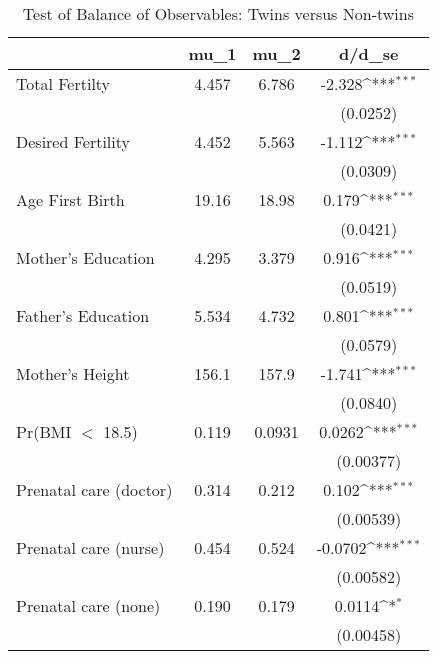 \begin{table}[htbp]\centering
\def\sym#1{\ifmmode^{#1}\else\(^{#1}\)\fi}
\caption{Test of Balance of Observables: Twins versus Non-twins \label{TWINtab:comp}}
\begin{tabular}{l*{1}{ccc}}
\toprule
                    &        mu\_1&        mu\_2&      d/d\_se         \\
\midrule
Total Fertilty      &       4.457&       6.786&      -2.328\sym{***}\\
                    &            &            &    (0.0252)         \\
Desired Fertility   &       4.452&       5.563&      -1.112\sym{***}\\
                    &            &            &    (0.0309)         \\
Age First Birth     &       19.16&       18.98&       0.179\sym{***}\\
                    &            &            &    (0.0421)         \\
Mother's Education  &       4.295&       3.379&       0.916\sym{***}\\
                    &            &            &    (0.0519)         \\
Father's Education  &       5.534&       4.732&       0.801\sym{***}\\
                    &            &            &    (0.0579)         \\
Mother's Height     &       156.1&       157.9&      -1.741\sym{***}\\
                    &            &            &    (0.0840)         \\
Pr(BMI $<$ 18.5)    &       0.119&      0.0931&      0.0262\sym{***}\\
                    &            &            &   (0.00377)         \\
Prenatal care (doctor)&       0.314&       0.212&       0.102\sym{***}\\
                    &            &            &   (0.00539)         \\
Prenatal care (nurse)&       0.454&       0.524&     -0.0702\sym{***}\\
                    &            &            &   (0.00582)         \\
Prenatal care (none)&       0.190&       0.179&      0.0114\sym{*}  \\
                    &            &            &   (0.00458)         \\

\end{tabular}
\end{table}
